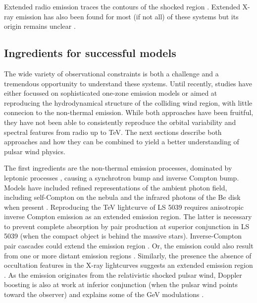 Extended radio emission traces the contours of the shocked region \citep{2006smqw.confE..52D,2011ApJ...732L..10M}. Extended X-ray emission has also been found for most (if not all) of these systems but its origin remains unclear  \citep{2014AN....335..301K}. 




\subsection { Ingredients for successful models}


The wide variety of observational constraints is both a challenge and a tremendous opportunity to understand these systems.  Until recently, studies have either focussed on sophisticated one-zone emission models or aimed at reproducing the hydrodynamical  structure of the colliding wind region, with little connecion to the non-thermal emission. While both approaches have been fruitful, they have not been able to consistently reproduce the  orbital variability and spectral features from radio up to TeV.   The next sections describe both approaches and how they can be combined to yield a better understanding of pulsar wind physics.

The first ingredients are the non-thermal emission processes, dominated by leptonic processes \citep{2006A&A...456..801D}, causing a synchrotron bump and inverse Compton bump.  Models have included refined  representations of the ambient photon field, including self-Compton on the nebula  \citep{2010A&A...519A..81C} and the infrared photons of the Be disk when present  \citep{2012MNRAS.426.3135V}. Reproducing the TeV lightcurve of LS 5039 requires anisotropic inverse Compton emission  \citep{2008A&A...477..691D} as an extended emission region. The latter is necessary to prevent complete absorption by pair production at  superior conjunction in LS 5039 (when the compact object is behind the massive stars).  Inverse-Compton pair cascades could extend the emission region \citep{2006MNRAS.371.1737B,2010A&A...519A..81C}. Or, the  emission could also result from one or more  distant emission regions \citep{2013A&A...551A..17Z}.  Similarly, {\cred the presence the absence} of occultation features in the X-ray lightcurves suggests an extended emission region \citep{2007A&A...473..545B,2011MNRAS.411..193S}.  As the emission originates from the relativistic shocked pulsar wind, Doppler boosting is also at work at inferior conjunction (when the pulsar wind points toward the observer) and explains some of the GeV modulations \citep{2010A&A...516A..18D}. 


